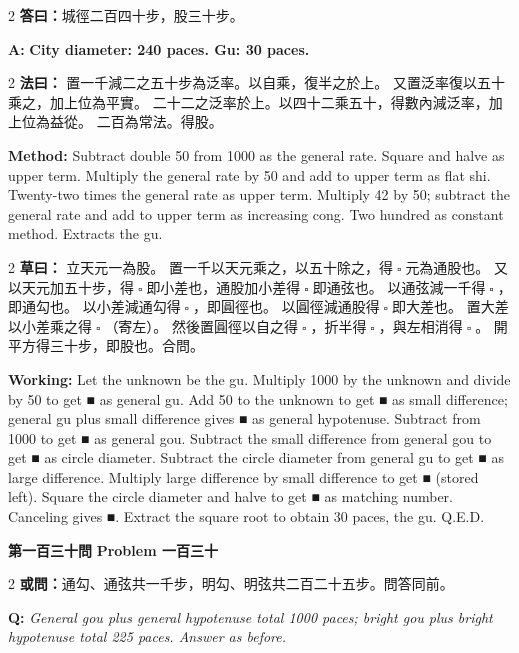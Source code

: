 \documentclass[11pt,a4paper]{article}
\let\origsquare\square
\renewcommand{\square}{\ensuremath{\origsquare}}%
\newcommand{\wen}[1]{%
  \par\vspace{0.5em}%
  \noindent\textcolor{problemcolor}{\textbf{第#1問}}%
  \hfill\textcolor{problemcolor}{\textbf{Problem #1}}\par\nopagebreak%
  \vspace{0.3em}%
}
\newcommand{\owen}[1]{%
  \noindent\textcolor{problemcolor}{\textbf{或問：}}{\tradfont #1}\par\nopagebreak%
}
\newcommand{\oweneng}[1]{%
  \noindent\textcolor{engcolor}{\textbf{Q: }}{\itshape #1}\par\nopagebreak%
}
\newcommand{\fayue}[1]{%
  \noindent\textcolor{methodcolor}{\textbf{法曰：}}{\tradfont #1}\par\nopagebreak%
}
\newcommand{\fayueeng}[1]{%
  \noindent\textcolor{engcolor}{\textbf{Method: }}{#1}\par\nopagebreak%
}
\newcommand{\tsaoyue}[1]{%
  \noindent\textcolor{workcolor}{\textbf{草曰：}}{\tradfont #1}\par%
}
\newcommand{\tsaoyueeng}[1]{%
  \noindent\textcolor{engcolor}{\textbf{Working: }}{\small #1}\par%
}
\newcommand{\dayue}[1]{%
  \noindent\textcolor{anscolor}{\textbf{答曰：}}{\tradfont #1}\par\nopagebreak%
}
\newcommand{\dayueeng}[1]{%
  \noindent\textcolor{engcolor}{\textbf{A: }}{\bfseries #1}\par\nopagebreak%
}
\begin{document}
\begin{paracol}{2}
\dayue{城徑二百四十步，股三十步。}
\switchcolumn
\dayueeng{City diameter: 240 paces. Gu: 30 paces.}
\end{paracol}

\begin{paracol}{2}
\fayue{%
置一千減二之五十步為泛率。以自乘，復半之於上。
又置泛率復以五十乘之，加上位為平實。
二十二之泛率於上。以四十二乘五十，得數內減泛率，加上位為益從。
二百為常法。得股。}
\switchcolumn
\fayueeng{%
Subtract double 50 from 1000 as the general rate. Square and halve as upper term. Multiply the general rate by 50 and add to upper term as flat shi. Twenty-two times the general rate as upper term. Multiply 42 by 50; subtract the general rate and add to upper term as increasing cong. Two hundred as constant method. Extracts the gu.}
\end{paracol}

\begin{paracol}{2}
\tsaoyue{%
立天元一為股。
置一千以天元乘之，以五十除之，得$ \; \square \; $元為通股也。
又以天元加五十步，得$ \; \square \; $即小差也，通股加小差得$ \; \square \; $即通弦也。
以通弦減一千得$ \; \square \; $，即通勾也。
以小差減通勾得$ \; \square \; $，即圓徑也。
以圓徑減通股得$ \; \square \; $即大差也。
置大差以小差乘之得$ \; \square \; $（寄左）。
然後置圓徑以自之得$ \; \square \; $，折半得$ \; \square \; $，與左相消得$ \; \square \; $。
開平方得三十步，即股也。合問。}
\switchcolumn
\tsaoyueeng{%
Let the unknown be the gu. Multiply 1000 by the unknown and divide by 50 to get ■ as general gu. Add 50 to the unknown to get ■ as small difference; general gu plus small difference gives ■ as general hypotenuse. Subtract from 1000 to get ■ as general gou. Subtract the small difference from general gou to get ■ as circle diameter. Subtract the circle diameter from general gu to get ■ as large difference. Multiply large difference by small difference to get ■ (stored left). Square the circle diameter and halve to get ■ as matching number. Canceling gives ■. Extract the square root to obtain 30 paces, the gu. Q.E.D.}
\end{paracol}

\vspace{0.5cm}

\wen{一百三十}

\begin{paracol}{2}
\owen{通勾、通弦共一千步，明勾、明弦共二百二十五步。問答同前。}
\switchcolumn
\oweneng{General gou plus general hypotenuse total 1000 paces; bright gou plus bright hypotenuse total 225 paces. Answer as before.}
\end{paracol}
\end{document}
